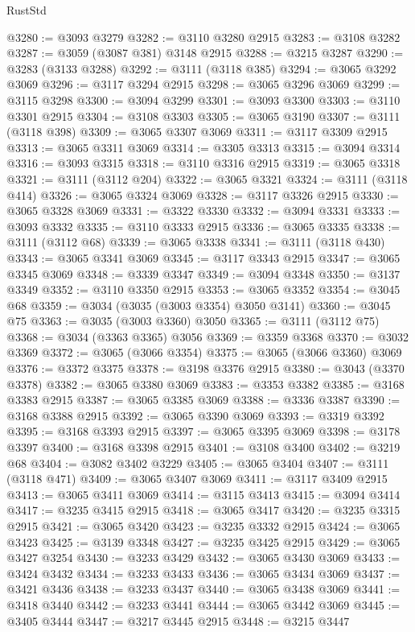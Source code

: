 \begin{lexlean}{RustStd}
\begin{coremodule}
@3280 := @3093 @3279
@3282 := @3110 @3280 @2915
@3283 := @3108 @3282
@3287 := @3059 (@3087 @381) @3148 @2915
@3288 := @3215 @3287
@3290 := @3283 (@3133 @3288)
@3292 := @3111 (@3118 @385)
@3294 := @3065 @3292 @3069
@3296 := @3117 @3294 @2915
@3298 := @3065 @3296 @3069
@3299 := @3115 @3298
@3300 := @3094 @3299
@3301 := @3093 @3300
@3303 := @3110 @3301 @2915
@3304 := @3108 @3303
@3305 := @3065 @3190
@3307 := @3111 (@3118 @398)
@3309 := @3065 @3307 @3069
@3311 := @3117 @3309 @2915
@3313 := @3065 @3311 @3069
@3314 := @3305 @3313
@3315 := @3094 @3314
@3316 := @3093 @3315
@3318 := @3110 @3316 @2915
@3319 := @3065 @3318
@3321 := @3111 (@3112 @204)
@3322 := @3065 @3321
@3324 := @3111 (@3118 @414)
@3326 := @3065 @3324 @3069
@3328 := @3117 @3326 @2915
@3330 := @3065 @3328 @3069
@3331 := @3322 @3330
@3332 := @3094 @3331
@3333 := @3093 @3332
@3335 := @3110 @3333 @2915
@3336 := @3065 @3335
@3338 := @3111 (@3112 @68)
@3339 := @3065 @3338
@3341 := @3111 (@3118 @430)
@3343 := @3065 @3341 @3069
@3345 := @3117 @3343 @2915
@3347 := @3065 @3345 @3069
@3348 := @3339 @3347
@3349 := @3094 @3348
@3350 := @3137 @3349
@3352 := @3110 @3350 @2915
@3353 := @3065 @3352
@3354 := @3045 @68
@3359 := @3034 (@3035 (@3003 @3354) @3050 @3141)
@3360 := @3045 @75
@3363 := @3035 (@3003 @3360) @3050
@3365 := @3111 (@3112 @75)
@3368 := @3034 (@3363 @3365) @3056
@3369 := @3359 @3368
@3370 := @3032 @3369
@3372 := @3065 (@3066 @3354)
@3375 := @3065 (@3066 @3360) @3069
@3376 := @3372 @3375
@3378 := @3198 @3376 @2915
@3380 := @3043 (@3370 @3378)
@3382 := @3065 @3380 @3069
@3383 := @3353 @3382
@3385 := @3168 @3383 @2915
@3387 := @3065 @3385 @3069
@3388 := @3336 @3387
@3390 := @3168 @3388 @2915
@3392 := @3065 @3390 @3069
@3393 := @3319 @3392
@3395 := @3168 @3393 @2915
@3397 := @3065 @3395 @3069
@3398 := @3178 @3397
@3400 := @3168 @3398 @2915
@3401 := @3108 @3400
@3402 := @3219 @68
@3404 := @3082 @3402 @3229
@3405 := @3065 @3404
@3407 := @3111 (@3118 @471)
@3409 := @3065 @3407 @3069
@3411 := @3117 @3409 @2915
@3413 := @3065 @3411 @3069
@3414 := @3115 @3413
@3415 := @3094 @3414
@3417 := @3235 @3415 @2915
@3418 := @3065 @3417
@3420 := @3235 @3315 @2915
@3421 := @3065 @3420
@3423 := @3235 @3332 @2915
@3424 := @3065 @3423
@3425 := @3139 @3348
@3427 := @3235 @3425 @2915
@3429 := @3065 @3427 @3254
@3430 := @3233 @3429
@3432 := @3065 @3430 @3069
@3433 := @3424 @3432
@3434 := @3233 @3433
@3436 := @3065 @3434 @3069
@3437 := @3421 @3436
@3438 := @3233 @3437
@3440 := @3065 @3438 @3069
@3441 := @3418 @3440
@3442 := @3233 @3441
@3444 := @3065 @3442 @3069
@3445 := @3405 @3444
@3447 := @3217 @3445 @2915
@3448 := @3215 @3447

\end{coremodule}
\end{lexlean}
